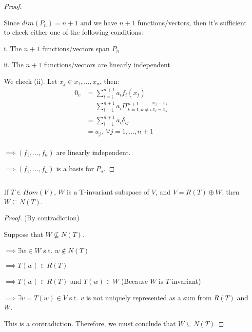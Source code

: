 \documentclass{article}
\newenvironment{customthm}[1]
  {\renewcommand\theinnercustomthm{#1}\innercustomthm}
  {\endinnercustomthm}
\begin{document}
\begin{proof}
  $ $

  Since $dim(P_n) = n+1$ and we have $n+1$ functions/vectors, then it's sufficient to check either one of the following conditions: 
  
  \qquad i. The $n+1$ functions/vectors span $P_n$

  \qquad ii. The $n+1$ functions/vectors are linearly independent.
  \newline

  We check (ii). Let $x_j \in x_1,\ldots,x_n$, then:
  \begin{align*}
    0_v &= \sum_{i=1}^{n+1} a_i f_i(x_j) &&\\
    &= \sum_{i=1}^{n+1} a_i \Pi_{k=1, k \neq i}^{n+1}\frac{x_j - x_k}{x_i - x_k} &&\\
    &= \sum_{i=1}^{n+1} a_i \delta_{ij} &&\\
    &= a_j, \ \forall j=1,\ldots,n+1 &&\\
  \end{align*}

  \noindent
  $\implies (f_1,\ldots,f_n)$ are linearly independent.

  \noindent
  $\implies (f_1,\ldots,f_n)$ is a basis for $P_n$.

\end{proof}
\newpage

\begin{customthm}{3}[2023.S(1.A.iii)]
  $ $

  If $T \in Hom(V)$, $W$ is a T-invariant subspace of $V$, and $V = R(T) \oplus W$, then $W \subseteq N(T)$. 

\end{customthm}
\begin{proof}{(By contradiction)}
  $ $

  Suppose that $W \not\subseteq N(T)$.
  
  \noindent
  $\implies \exists w \in W$ s.t. $w \notin N(T)$

  \noindent
  $\implies T(w) \in R(T)$

  \noindent
  $\implies T(w) \in R(T)$ and $T(w) \in W$ \quad (Because $W$ is $T$-invariant)

  \noindent
  $\implies \exists v=T(w) \in V$ s.t. $v$ is not uniquely represented as a sum from $R(T)$ and $W$.
  \newline

  \noindent
  This is a contradiction. Therefore, we must conclude that $W \subseteq N(T)$

\end{proof}
\newpage
\end{document}
